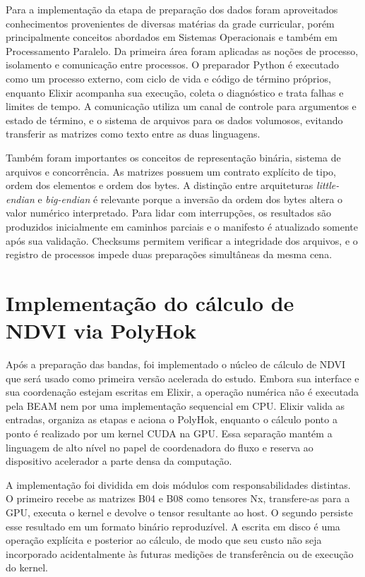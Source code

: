 \documentclass[tcc,capa]{texufpel}
\begin{document}
Para a implementação da etapa de preparação dos dados foram aproveitados
conhecimentos provenientes de diversas matérias da grade curricular, porém
principalmente conceitos abordados em Sistemas Operacionais e também em
Processamento Paralelo. Da primeira área foram aplicadas as noções de processo,
isolamento e comunicação entre processos. O preparador Python é executado como um
processo externo, com ciclo de vida e código de término próprios, enquanto Elixir
acompanha sua execução, coleta o diagnóstico e trata falhas e limites de tempo. A
comunicação utiliza um canal de controle para argumentos e estado de término, e o
sistema de arquivos para os dados volumosos, evitando transferir as matrizes como
texto entre as duas linguagens.

Também foram importantes os conceitos de representação binária, sistema de arquivos
e concorrência. As matrizes possuem um contrato explícito de tipo, ordem dos
elementos e ordem dos bytes. A distinção entre arquiteturas \textit{little-endian}
e \textit{big-endian} é relevante porque a inversão da ordem dos bytes altera o
valor numérico interpretado. Para lidar com interrupções, os resultados são
produzidos inicialmente em caminhos parciais e o manifesto é atualizado somente
após sua validação. Checksums permitem verificar a integridade dos arquivos, e o
registro de processos impede duas preparações simultâneas da mesma cena.

\section{Implementação do cálculo de NDVI via PolyHok}
\label{sec:implementacao-ndvi-polyhok}

Após a preparação das bandas, foi implementado o núcleo de cálculo de NDVI que
será usado como primeira versão acelerada do estudo. Embora sua interface e sua
coordenação estejam escritas em Elixir, a operação numérica não é executada pela
BEAM nem por uma implementação sequencial em CPU. Elixir valida as entradas,
organiza as etapas e aciona o PolyHok, enquanto o cálculo ponto a ponto é realizado
por um kernel CUDA na GPU. Essa separação mantém a linguagem de alto nível no papel
de coordenadora do fluxo e reserva ao dispositivo acelerador a parte densa da
computação.

A implementação foi dividida em dois módulos com responsabilidades distintas. O
primeiro recebe as matrizes B04 e B08 como tensores Nx, transfere-as para a GPU,
executa o kernel e devolve o tensor resultante ao host. O segundo persiste esse
resultado em um formato binário reproduzível. A escrita em disco é uma operação
explícita e posterior ao cálculo, de modo que seu custo não seja incorporado
acidentalmente às futuras medições de transferência ou de execução do kernel.
\end{document}

